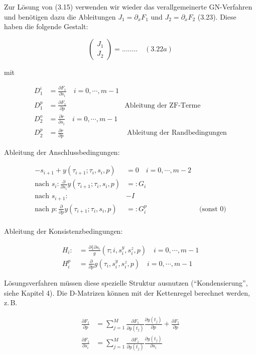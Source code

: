 Zur Lösung von (3.15) verwenden wir wieder das verallgemeinerte GN-Verfahren und benötigen dazu die Ableitungen $J_1 = \partial_x F_1$ und $J_2 = \partial_x F_2$ (3.23). Diese haben die folgende Gestalt:

\[ \begin{pmatrix} J_1 \\ J_2 \end{pmatrix} = ........ \quad (3.22a)\]

mit

\begin{align*}
D_1^i &= \frac{\partial F_1}{\partial s_i} \quad i=0,\cdots,m-1 \\
D_1^p &= \frac{\partial F_1}{\partial p} & \text{Ableitung der ZF-Terme} \\
D_2^o &= \frac{\partial r}{\partial s_i} \quad i=0,\cdots,m-1 \\
D_2^p &= \frac{\partial r}{\partial p} & \text{ Ableitung der Randbedingungen}
\end{align*}

Ableitung der Anschlussbedingungen:

\begin{align*}
-s_{i+1} + y(\tau_{i+1}; \tau_i, s_i, p) &= 0 \quad i=0,\cdots,m-2 \\
\text{nach }s_i\colon \frac{\partial}{\partial s_i} y(\tau_{i+1}; \tau_i, s_i, p) &=\colon G_i \\
\text{nach }s_{i+1}\colon &-I \\
\text{nach }p\colon  \frac{\partial}{\partial p}y(\tau_{i+1}; \tau_i, s_i, p) &=\colon G_i^p & \text{ (sonst 0)}\\
\end{align*}

Ableitung der Konsistenzbedingungen:

\begin{align*}
H_i \colon&= \frac{\partial\{\partial s_i} g(\tau;i, s_i^y, s_i^z, p) \quad i=0,\cdots,m-1 \\
H_i^p &= \frac{\partial}{\partial p} g(\tau_i, s_i^y, s_i^z, p) \quad i=0,\cdots,m-1
\end{align*}

Lösungsverfahren müssen diese spezielle Struktur ausnutzen ("`Kondensierung"', siehe Kapitel 4). Die D-Matrizen können mit der Kettenregel berechnet werden, z.\,B.

\begin{align*}
\frac{\partial F_1}{\partial p} &= \sum_{j=1}^M \frac{\partial F_1}{\partial y(t_j)} \frac{\partial y(t_j)}{\partial p} + \frac{\partial F_1}{\partial p} \\
\frac{\partial F_1}{\partial s_i} &= \sum_{j=1}^M \frac{\partial F_1}{\partial y(t_j)} \frac{\partial y(t_j)}{\partial s_i}
\end{align*}

